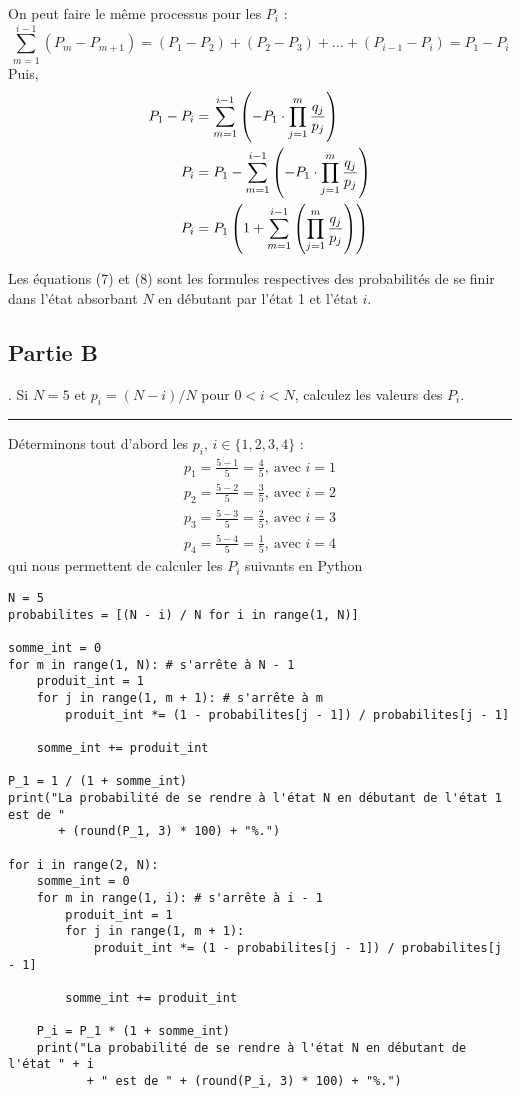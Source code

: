\documentclass{article}
\begin{document}
\noindent On peut faire le même processus pour les $P_i$ :
\[
    \sum_{m=1}^{i-1}(P_m-P_{m+1})=(P_1-P_2)+(P_2-P_3)+\dots+(P_{i-1}-P_i)=P_1-P_i
\]
Puis,
\begin{align}
    P_1-P_i&=\sum_{m=1}^{i-1}\left(-P_1\cdot \prod_{j=1}^{m}\frac{q_j}{p_j}\right) \notag \\
    P_i&=P_1-\sum_{m=1}^{i-1}\left(-P_1\cdot \prod_{j=1}^{m}\frac{q_j}{p_j}\right) \notag \\
    P_i&=P_1\left(1+\sum_{m=1}^{i-1}\left(\prod_{j=1}^{m}\frac{q_j}{p_j}\right)\right)
\end{align}

Les équations (7) et (8) sont les formules respectives des probabilités de se
finir dans l'état absorbant $N$ en débutant par l'état 1 et l'état $i$.

\newpage
\subsection*{Partie B}
. Si $N=5$ et $p_i=(N-i)/N$ pour $0<i<N$, calculez les valeurs des $P_i$.
\vspace{.2cm}
\hrule
\vspace{.4cm}
Déterminons tout d'abord les $p_i,\, i\in\{1,2,3,4\}$ :
\begin{gather}
    p_1=\frac{5-1}{5}=\frac{4}{5},\ \text{avec } i=1 \\
    p_2=\frac{5-2}{5}=\frac{3}{5},\ \text{avec } i=2 \\
    p_3=\frac{5-3}{5}=\frac{2}{5},\ \text{avec } i=3 \\
    p_4=\frac{5-4}{5}=\frac{1}{5},\ \text{avec } i=4
\end{gather}
qui nous permettent de calculer les $P_i$ suivants en Python
\begin{verbatim}
N = 5
probabilites = [(N - i) / N for i in range(1, N)]

somme_int = 0
for m in range(1, N): # s'arrête à N - 1
    produit_int = 1
    for j in range(1, m + 1): # s'arrête à m
        produit_int *= (1 - probabilites[j - 1]) / probabilites[j - 1]

    somme_int += produit_int

P_1 = 1 / (1 + somme_int)
print("La probabilité de se rendre à l'état N en débutant de l'état 1 est de "
       + (round(P_1, 3) * 100) + "%.")

for i in range(2, N):
    somme_int = 0
    for m in range(1, i): # s'arrête à i - 1
        produit_int = 1
        for j in range(1, m + 1):
            produit_int *= (1 - probabilites[j - 1]) / probabilites[j - 1]

        somme_int += produit_int

    P_i = P_1 * (1 + somme_int)
    print("La probabilité de se rendre à l'état N en débutant de l'état " + i 
           + " est de " + (round(P_i, 3) * 100) + "%.")
\end{verbatim}
\end{document}

